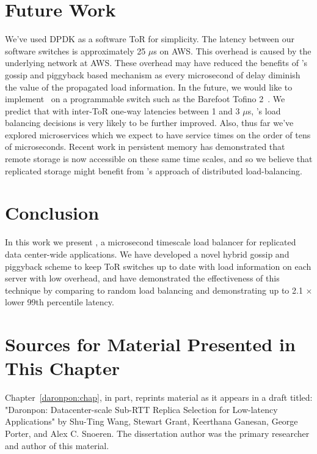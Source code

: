 \section{Future Work}
\label{darapon:sec:future}

We've used DPDK as a software ToR for simplicity. The latency between our
software switches is approximately 25 $\mu$s on AWS.  This overhead is caused by the underlying network at AWS. 
%
These overhead may have reduced the benefits of \daronpon's gossip and piggyback based mechanism as every microsecond of delay diminish the value of the propagated load information.
%
In the future, we would like to implement \daronpon\ on
a programmable switch such as the Barefoot Tofino 2~\cite{tofino2}. We predict that with inter-ToR one-way latencies between 1 and 3 $\mu$s, \daronpon's load balancing decisions is very likely to be further improved.  Also, thus far we've explored microservices which we expect to have service times on the order of tens of microseconds.
%
Recent work in persistent memory has demonstrated that remote storage is now
accessible on these same time scales, and so we believe that replicated storage
might benefit from \daronpon's approach of distributed load-balancing.

\section{Conclusion}
\label{darapon:sec:conclusion}

In this work we present \daronpon, a microsecond timescale load balancer for
replicated data center-wide applications.  We have developed a novel hybrid
gossip and piggyback scheme to keep ToR switches up to date 
with load information on each server with low overhead, and have demonstrated the effectiveness of this technique by comparing to random load balancing and demonstrating up to 2.1 $\times$ lower 99th percentile latency.

\section{Sources for Material Presented in This Chapter}
Chapter~\ref{daronpon:chap}, in part, reprints material as it appears in a draft titled: 
"Daronpon: Datacenter-scale Sub-RTT Replica Selection for Low-latency Applications"
by Shu-Ting Wang, Stewart Grant, Keerthana Ganesan, George Porter, and Alex C. Snoeren.
The dissertation author was the primary researcher and author of this material.
